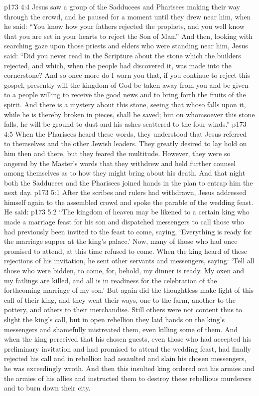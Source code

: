 \vs p173 4:4 Jesus saw a group of the Sadducees and Pharisees making their way through the crowd, and he paused for a moment until they drew near him, when he said: \textcolor{ubdarkred}{“You know how your fathers rejected the prophets, and you well know that you are set in your hearts to reject the Son of Man.”} And then, looking with searching gaze upon those priests and elders who were standing near him, Jesus said: \textcolor{ubdarkred}{“Did you never read in the Scripture about the stone which the builders rejected, and which, when the people had discovered it, was made into the cornerstone? And so once more do I warn you that, if you continue to reject this gospel, presently will the kingdom of God be taken away from you and be given to a people willing to receive the good news and to bring forth the fruits of the spirit. And there is a mystery about this stone, seeing that whoso falls upon it, while he is thereby broken in pieces, shall be saved; but on whomsoever this stone falls, he will be ground to dust and his ashes scattered to the four winds.”}
\vs p173 4:5 When the Pharisees heard these words, they understood that Jesus referred to themselves and the other Jewish leaders. They greatly desired to lay hold on him then and there, but they feared the multitude. However, they were so angered by the Master’s words that they withdrew and held further counsel among themselves as to how they might bring about his death. And that night both the Sadducees and the Pharisees joined hands in the plan to entrap him the next day.
\vs p173 5:1 After the scribes and rulers had withdrawn, Jesus addressed himself again to the assembled crowd and spoke the parable of the wedding feast. He said:
\pc \vs p173 5:2 \textcolor{ubdarkred}{“The kingdom of heaven may be likened to a certain king who made a marriage feast for his son and dispatched messengers to call those who had previously been invited to the feast to come, saying, ‘Everything is ready for the marriage supper at the king’s palace.’ Now, many of those who had once promised to attend, at this time refused to come. When the king heard of these rejections of his invitation, he sent other servants and messengers, saying: ‘Tell all those who were bidden, to come, for, behold, my dinner is ready. My oxen and my fatlings are killed, and all is in readiness for the celebration of the forthcoming marriage of my son.’ But again did the thoughtless make light of this call of their king, and they went their ways, one to the farm, another to the pottery, and others to their merchandise. Still others were not content thus to slight the king’s call, but in open rebellion they laid hands on the king’s messengers and shamefully mistreated them, even killing some of them. And when the king perceived that his chosen guests, even those who had accepted his preliminary invitation and had promised to attend the wedding feast, had finally rejected his call and in rebellion had assaulted and slain his chosen messengers, he was exceedingly wroth. And then this insulted king ordered out his armies and the armies of his allies and instructed them to destroy these rebellious murderers and to burn down their city.}
